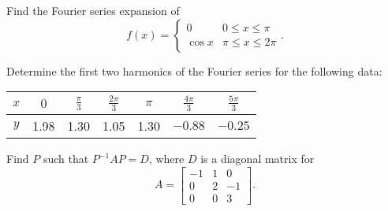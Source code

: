 \documentclass[a4paper,12pt]{vitexam}
\begin{document}
\begin{questions}

     

\question[10]  Find   the Fourier series expansion of 
$$ f(x) = \begin{cases}
	0 & 0\leq x \leq \pi \\
	\cos x & \pi \leq x \leq  2\pi
\end{cases}.
$$

     

\question[10]  Determine the first two harmonics of the Fourier series for the following data:

\begin{center}
\begin{tabular}{|c|c|c|c|c|c|c|}
	\hline 
	$x$ & $0$ & $\frac {\pi}{3}$ & $\frac {2\pi}{3}$ & $\pi$ & $\frac {4\pi}{3}$ & $\frac {5\pi}{3}$ \\ \hline 
	$y$ & 1.98&1.30&1.05&1.30& $-0.88$ &$-0.25$ \\ \hline 
\end{tabular}
\end{center}

     

\question[10] Find $P$ such that $P^{-1}AP = D$, where $D$ is a diagonal matrix for 
$$A = \begin{bmatrix}
	-1 & 1 & 0 \\ 0 & 2 & -1 \\  0 & 0 & 3 
\end{bmatrix}.$$

     

\question
{}


\end{questions}
\end{document}
